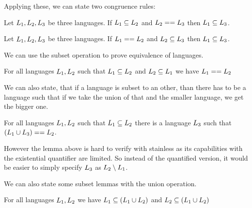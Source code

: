 Applying these, we can state two congruence rules:

\begin{lemma}
	\label{lem:sameAsSubsetTrans}
	Let $L_{1}, L_{2}, L_{3}$ be three languages. If $L_{1} \subseteq L_{2}$ and  $L_{2} == L_{3}$ then  $L_{1} \subseteq L_{3}$.
\end{lemma}

\begin{lemma}
	\label{lem:sameAsSubsetTrans2}
	Let $L_{1}, L_{2}, L_{3}$ be three languages. If $L_{1} == L_{2}$ and  $L_{2} \subseteq L_{3}$ then  $L_{1} \subseteq L_{3}$.
\end{lemma}

We can use the subset operation to prove equivalence of languages.
\begin{lemma}
	\label{subsetSupersetSame}
	For all languages $L_{1}, L_{2}$ such that $L_{1} \subseteq L_{2}$ and $L_{2} \subseteq L_{1}$ we have $L_{1} == L_{2}$
\end{lemma}

We can also state, that if a language is subset to an other, than there has to be a language such that if we take the union of that and the smaller language, we get the bigger one.

\begin{lemma}
	\label{lem:subsetSplit}
	For all languages $L_{1}, L_{2}$ such that $L_{1} \subseteq L_{2}$ there is a language $L_{3}$ such that $(L_{1} \cup L_{3}) == L_{2}$.
\end{lemma}

However the lemma above is hard to verify with stainless as its capabilities with the existential quantifier are limited. So instead of the quantified version, it would be easier to simply specify $L_{3}$ as $L_{2} \setminus L_{1}$.

We can also state some subset lemmas with the union operation.

\begin{lemma}
	\label{lem:inUnionSubset}
	For all languages $L_{1}, L_{2}$ we have $L_{1} \subseteq (L_{1} \cup L_{2})$ and $L_{2} \subseteq (L_{1} \cup L_{2})$
\end{lemma}


